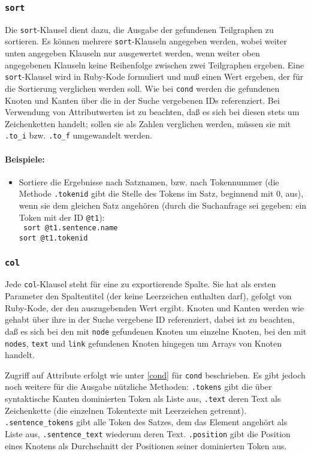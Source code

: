 \documentclass[12pt]{scrartcl}
\begin{document}
\subsubsection{\texttt{sort}}

Die \texttt{sort}-Klausel dient dazu, die Ausgabe der gefundenen Teilgraphen zu sortieren. Es können mehrere \texttt{sort}-Klauseln angegeben werden, wobei weiter unten angegeben Klauseln nur ausgewertet werden, wenn  weiter oben angegebenen Klauseln keine Reihenfolge zwischen zwei Teilgraphen ergeben. 
Eine \texttt{sort}-Klausel wird in Ruby-Kode formuliert und muß einen Wert ergeben, der für die Sortierung verglichen werden soll. Wie bei \texttt{cond} werden die gefundenen Knoten und Kanten über die in der Suche vergebenen IDs referenziert. Bei Verwendung von Attributwerten ist zu beachten, daß es sich bei diesen stets um Zeichenketten handelt; sollen sie als Zahlen verglichen werden, müssen sie mit \texttt{.to\_i} bzw. \texttt{.to\_f} umgewandelt werden.

\paragraph*{Beispiele:}
\begin{itemize}
	\item Sortiere die Ergebnisse nach Satznamen, bzw. nach Tokennummer (die Methode \texttt{.tokenid} gibt die Stelle des Tokens im Satz, beginnend mit 0, aus), wenn sie dem gleichen Satz angehören (durch die Suchanfrage sei gegeben: ein Token mit der ID \texttt{@t1}):\\
	{\tt
	sort @t1.sentence.name\\[-.4ex]
	sort @t1.tokenid\\[-.4ex]
	}
\end{itemize}



\subsubsection{\texttt{col}}

Jede \texttt{col}-Klausel steht für eine zu exportierende Spalte. Sie hat als ersten Parameter den Spaltentitel (der keine Leerzeichen enthalten darf), gefolgt von Ruby-Kode, der den auszugebenden Wert ergibt. Knoten und Kanten werden wie gehabt über ihre in der Suche vergebene ID referenziert, dabei ist zu beachten, daß es sich bei den mit \texttt{node} gefundenen Knoten um einzelne Knoten, bei den mit \texttt{nodes}, \texttt{text} und \texttt{link} gefundenen Knoten hingegen um Arrays von Knoten handelt.

Zugriff auf Attribute erfolgt wie unter \ref{cond} für \texttt{cond} beschrieben. Es gibt jedoch noch weitere für die Ausgabe nützliche Methoden: \texttt{.tokens} gibt die über syntaktische Kanten dominierten Token als Liste aus, \texttt{.text} deren Text als Zeichenkette (die einzelnen Tokentexte mit Leerzeichen getrennt). \texttt{.sentence\_tokens} gibt alle Token des Satzes, dem das Element angehört als Liste aus, \texttt{.sentence\_text} wiederum deren Text. \texttt{.position} gibt die Position eines Knotens als Durchschnitt der Positionen seiner dominierten Token aus.
\end{document}
